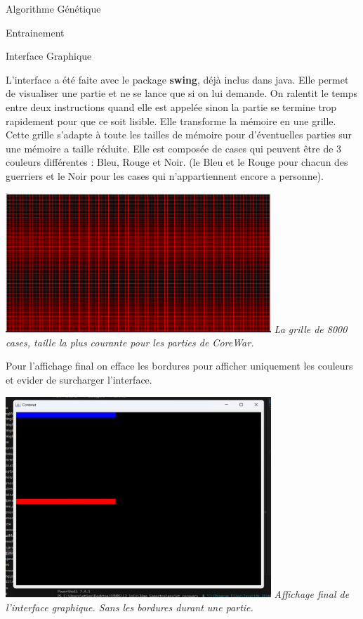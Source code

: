 \documentclass[a4paper, 10pt]{article}
\begin{document}
\begin{section}{Algorithme Génétique}
\begin{subsection}{Entrainement}
        \end{subsection}
    \end{section}

    \begin{section}{Interface Graphique}
        \par
            L'interface a été faite avec le package \textbf{swing}, déjà inclus dans java. Elle permet de visualiser une partie et ne se lance que si on lui demande. On ralentit le temps entre deux instructions quand elle est appelée sinon la partie se termine trop rapidement pour que ce soit lisible. Elle transforme la mémoire en une grille. Cette grille s'adapte à toute les tailles de mémoire pour d'éventuelles parties sur une mémoire a taille réduite. Elle est composée de cases qui peuvent être de 3 couleurs différentes : Bleu, Rouge et Noir. (le Bleu et le Rouge pour chacun des guerriers et le Noir pour les cases qui n'appartiennent encore a personne).
            \bigskip
        
            \includegraphics[width=10cm]{img/grille_interface.png}\newline
            \textit{La grille de 8000 cases, taille la plus courante pour les parties de CoreWar.}
            \bigskip

        \par
            Pour l'affichage final on efface les bordures pour afficher uniquement les couleurs et evider de surcharger l'interface.
            \bigskip

            \includegraphics[width=10cm]{img/display.jpg}\newline
            \textit{Affichage final de l'interface graphique. Sans les bordures durant une partie.}
            \bigskip
        

\end{section}
\end{document}
